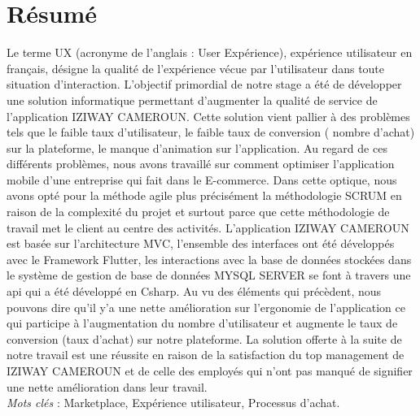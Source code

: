 \chapter*{Résumé}                      %
\thispagestyle{fancy}
\vspace{-2cm}

















Le terme UX (acronyme de l’anglais : User Expérience), expérience utilisateur en français, désigne la qualité de l’expérience vécue par l’utilisateur dans toute situation d’interaction. L’objectif primordial de notre stage a été de développer une solution informatique permettant d’augmenter la qualité de service de l’application IZIWAY CAMEROUN. Cette solution vient pallier à des problèmes tels que le faible taux d’utilisateur, le faible taux de conversion ( nombre d’achat) sur la plateforme, le manque d’animation sur l’application. Au regard de ces différents problèmes, nous avons travaillé sur comment optimiser l’application mobile d’une entreprise qui fait dans le E-commerce. Dans cette optique, nous avons opté pour la méthode agile plus précisément la méthodologie SCRUM en raison de la complexité du projet et surtout parce que cette méthodologie de travail met le client au centre des activités.  L’application IZIWAY CAMEROUN est basée sur l’architecture MVC, l’ensemble des interfaces ont été développés avec le Framework Flutter, les interactions avec la base de données stockées dans le système de gestion de base de données MYSQL SERVER se font à travers une api qui a été développé en Csharp. Au vu des éléments qui précèdent, nous pouvons dire qu’il y’a une nette amélioration sur l’ergonomie de l’application ce qui participe à l’augmentation du nombre d’utilisateur et augmente le taux de conversion (taux d’achat) sur notre plateforme. La solution offerte à la suite de notre travail est une réussite en raison de la satisfaction du top management de IZIWAY CAMEROUN et de celle des employés qui n’ont pas manqué de signifier une nette amélioration dans leur travail.\\


\textit{Mots clés} : Marketplace, Expérience utilisateur, Processus d’achat.